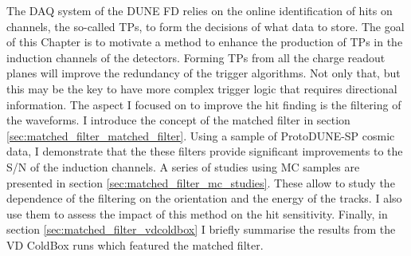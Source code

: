 The DAQ system of the DUNE FD relies on the online identification of hits on channels, the so-called TPs, to form the decisions of what data to store. The goal of this Chapter is to motivate a method to enhance the production of TPs in the induction channels of the detectors. Forming TPs from all the charge readout planes will improve the redundancy of the trigger algorithms. Not only that, but this may be the key to have more complex trigger logic that requires directional information. The aspect I focused on to improve the hit finding is the filtering of the waveforms. I introduce the concept of the matched filter in section \ref{sec:matched_filter_matched_filter}. Using a sample of ProtoDUNE-SP cosmic data, I demonstrate that the these filters provide significant improvements to the S/N of the induction channels. A series of studies using MC samples are presented in section \ref{sec:matched_filter_mc_studies}. These allow to study the dependence of the filtering on the orientation and the energy of the tracks. I also use them to assess the impact of this method on the hit sensitivity. Finally, in section \ref{sec:matched_filter_vdcoldbox} I briefly summarise the results from the VD ColdBox runs which featured the matched filter.
